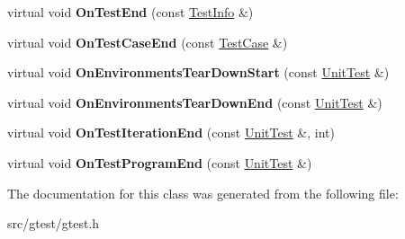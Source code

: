 \begin{DoxyCompactItemize}
\item 
\mbox{\label{classtesting_1_1_empty_test_event_listener_afd58d21005f0d0d0399fb114627545d3}} 
virtual void {\bfseries On\+Test\+End} (const \mbox{\hyperlink{classtesting_1_1_test_info}{Test\+Info}} \&)
\item 
\mbox{\label{classtesting_1_1_empty_test_event_listener_a6bec703158283104c4298f7d8a528515}} 
virtual void {\bfseries On\+Test\+Case\+End} (const \mbox{\hyperlink{classtesting_1_1_test_case}{Test\+Case}} \&)
\item 
\mbox{\label{classtesting_1_1_empty_test_event_listener_a00fa1a4ea5831e20746188414268e7c6}} 
virtual void {\bfseries On\+Environments\+Tear\+Down\+Start} (const \mbox{\hyperlink{classtesting_1_1_unit_test}{Unit\+Test}} \&)
\item 
\mbox{\label{classtesting_1_1_empty_test_event_listener_aea64c83c415b33a4c0b0239bafd1438d}} 
virtual void {\bfseries On\+Environments\+Tear\+Down\+End} (const \mbox{\hyperlink{classtesting_1_1_unit_test}{Unit\+Test}} \&)
\item 
\mbox{\label{classtesting_1_1_empty_test_event_listener_a2253e5a18b3cf7bccd349567a252209d}} 
virtual void {\bfseries On\+Test\+Iteration\+End} (const \mbox{\hyperlink{classtesting_1_1_unit_test}{Unit\+Test}} \&, int)
\item 
\mbox{\label{classtesting_1_1_empty_test_event_listener_a0abcc02bd2331a2e29ad6f4d9daf2a32}} 
virtual void {\bfseries On\+Test\+Program\+End} (const \mbox{\hyperlink{classtesting_1_1_unit_test}{Unit\+Test}} \&)
\end{DoxyCompactItemize}


The documentation for this class was generated from the following file\+:\begin{DoxyCompactItemize}
\item 
src/gtest/gtest.\+h\end{DoxyCompactItemize}
